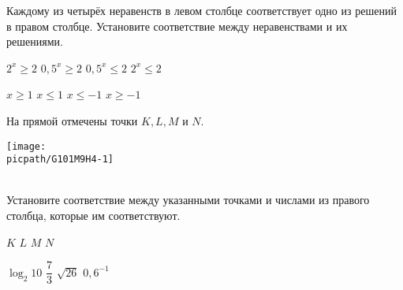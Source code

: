 \begin{homework}[number=4]
\begin{listofex}
		\item Каждому из четырёх неравенств в левом столбце соответствует одно из решений в правом столбце. Установите соответствие между неравенствами и их решениями. \\
		\begin{minipage}[t]{0.5\linewidth}
			\begin{tasks}
				\task \( 2^x \ge 2\)
				\task \( 0,5^x \ge 2 \)
				\task \( 0,5^x \le 2 \)
				\task \( 2^x \le 2 \)
			\end{tasks}
		\end{minipage}
		\hspace{0.02\linewidth}
		\begin{minipage}[t]{0.4\linewidth}
			\begin{tasks}
				\task \( x \ge 1 \)
				\task \( x \le 1 \)
				\task \( x \le -1 \)
				\task \( x \ge -1 \)
			\end{tasks}
		\end{minipage}
		\item На прямой отмечены точки \(K, L, M\) и \(N\). \\
		\begin{minipage}[t]{0.8\linewidth}
			\texttt{[image: \\picpath/G101M9H4-1]}
		\end{minipage}
		\\
		Установите соответствие между указанными точками и числами из правого столбца, которые им соответствуют.
		\\
		\begin{minipage}[t]{0.4\linewidth}
			\begin{tasks}
				\task \( K \)
				\task \(  L\)
				\task \( M \)
				\task \(  N\)
			\end{tasks}
		\end{minipage}
		\begin{minipage}[t]{0.4\linewidth}
			\begin{tasks}
				\task \( \log_2 10 \)
				\task \( \dfrac{ 7 }{ 3 } \)
				\task \( \sqrt{26} \)
				\task \( 0,6^{-1} \)
			\end{tasks}
		\end{minipage}
		

\end{listofex}
\end{homework}
